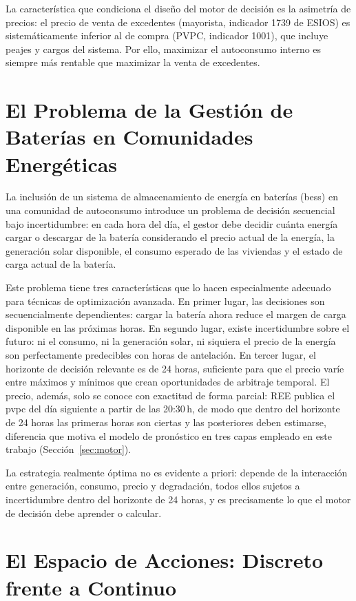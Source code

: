 \documentclass[12pt, a4paper, twoside]{report}
\begin{document}
La característica que condiciona el diseño del motor de decisión es la asimetría
de precios: el precio de venta de excedentes (mayorista, indicador 1739 de
ESIOS) es sistemáticamente inferior al de compra (PVPC, indicador 1001), que
incluye peajes y cargos del sistema. Por ello, maximizar el autoconsumo interno
es siempre más rentable que maximizar la venta de excedentes.

\section{El Problema de la Gestión de Baterías en Comunidades Energéticas}

La inclusión de un sistema de almacenamiento de energía en baterías
(\acrshort{bess}) en una comunidad de autoconsumo introduce un problema de
decisión secuencial bajo incertidumbre: en cada hora del día, el gestor debe
decidir cuánta energía cargar o descargar de la batería considerando el precio
actual de la energía, la generación solar disponible, el consumo esperado de
las viviendas y el estado de carga actual de la batería.

Este problema tiene tres características que lo hacen especialmente adecuado
para técnicas de optimización avanzada. En primer lugar, las decisiones son
secuencialmente dependientes: cargar la batería ahora reduce el margen de carga
disponible en las próximas horas. En segundo lugar, existe incertidumbre sobre
el futuro: ni el consumo, ni la generación solar, ni siquiera el precio de la
energía son perfectamente predecibles con horas de antelación. En tercer lugar,
el horizonte de decisión relevante es de 24 horas, suficiente para que el precio
varíe entre máximos y mínimos que crean oportunidades de arbitraje temporal. El
precio, además, solo se conoce con exactitud de forma parcial: REE publica el
\acrshort{pvpc} del día siguiente a partir de las 20:30\,h, de modo que dentro
del horizonte de 24 horas las primeras horas son ciertas y las posteriores deben
estimarse, diferencia que motiva el modelo de pronóstico en tres capas empleado
en este trabajo (Sección~\ref{sec:motor}).

La estrategia realmente óptima no es evidente a priori: depende de la
interacción entre generación, consumo, precio y degradación, todos ellos
sujetos a incertidumbre dentro del horizonte de 24 horas, y es precisamente lo
que el motor de decisión debe aprender o calcular.

\section{El Espacio de Acciones: Discreto frente a Continuo}
\end{document}
